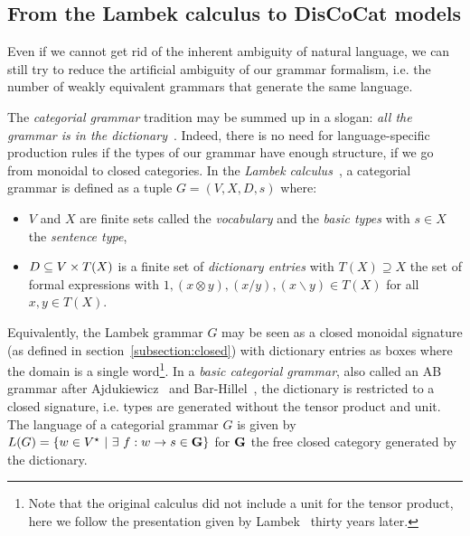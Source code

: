 
\subsection{From the Lambek calculus to DisCoCat models}

Even if we cannot get rid of the inherent ambiguity of natural language, we can still try to reduce the artificial ambiguity of our grammar formalism, i.e. the number of weakly equivalent grammars that generate the same language.

The \emph{categorial grammar} tradition may be summed up in a slogan: \emph{all the grammar is in the dictionary}~\cite{Preller07}.
Indeed, there is no need for language-specific production rules if the types of our grammar have enough structure, if we go from monoidal to closed categories.
In the \emph{Lambek calculus}~\cite{Lambek58}, a categorial grammar is defined as a tuple $G = (V, X, D, s)$ where:
\begin{itemize}
\item $V$ and $X$ are finite sets called the \emph{vocabulary} and the \emph{basic types} with $s \in X$ the \emph{sentence type},
\item $D \subseteq V \times T(X)$ is a finite set of \emph{dictionary entries} with $T(X) \supseteq X$ the set of formal expressions with $1, (x \otimes y), (x / y), (x \backslash y) \in T(X)$ for all $x, y \in T(X)$.
\end{itemize}
Equivalently, the Lambek grammar $G$ may be seen as a closed monoidal signature (as defined in section~\ref{subsection:closed}) with dictionary entries as boxes where the domain is a single word\footnote
{Note that the original calculus did not include a unit for the tensor product, here we follow the presentation given by Lambek~\cite{Lambek88} thirty years later.}.
In a \emph{basic categorial grammar}, also called an AB grammar after Ajdukiewicz~\cite{Ajdukiewicz35} and Bar-Hillel~\cite{Bar-Hillel54}, the dictionary is restricted to a closed signature, i.e. types are generated without the tensor product and unit.
The language of a categorial grammar $G$ is given by $L(G) = \{ w \in V^\star \ \vert \ \exists \ f : w \to s \in \G \}$ for $\mathbf{G}$ the free closed category generated by the dictionary.

